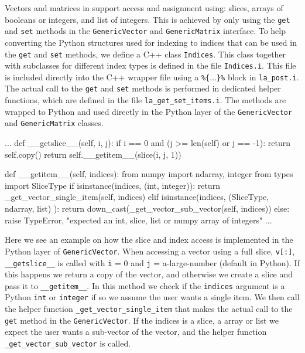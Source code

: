 Vectors and matrices in \pydolfin support access and assignment using: slices, \numpy arrays of booleans or integers, and list of integers. This is achieved by only using the \texttt{get} and \texttt{set} methods in the \texttt{GenericVector} and \texttt{GenericMatrix} interface. To help converting the Python structures used for indexing to indices that can be used in the \texttt{get} and \texttt{set} methods, we define a C++ class \texttt{Indices}. This class together with subclasses for different index types is defined in the file \texttt{Indices.i}. This file is included directly into the C++ wrapper file using a \texttt{\%\{$\ldots$\}\%} block in \texttt{la\_post.i}. The actual call to the \texttt{get} and \texttt{set} methods is performed in dedicated helper functions, which are defined in the file \texttt{la\_get}\texttt{\_set\_items.i}. The methods are wrapped to Python and used directly in the Python layer of the \texttt{GenericVector} and \texttt{GenericMatrix} classes.
\begin{c++}
   ...
    def __getslice__(self, i, j):
        if i == 0 and (j >= len(self) or j == -1):
            return self.copy()
        return self.__getitem__(slice(i, j, 1))

    def __getitem__(self, indices):
        from numpy import ndarray, integer
        from types import SliceType
        if isinstance(indices, (int, integer)):
            return _get_vector_single_item(self, indices)
        elif isinstance(indices, (SliceType, ndarray, list) ):
            return down_cast(_get_vector_sub_vector(self, indices))
        else:
            raise TypeError, "expected an int, slice, list or numpy array of integers"
  ...
\end{c++}
Here we see an example on how the slice and index access is implemented in the Python layer of \texttt{GenericVector}. When accessing a vector using a full slice, \texttt{v[:]}, \texttt{\_\_getslice\_\_} is called with \texttt{i} = 0 and \texttt{j} = a-large-number (default in Python).  If this happens we return a copy of the vector, and otherwise we create a slice and pass it to \texttt{\_\_getitem\_\_}. In this method we check if the \texttt{indices} argument is a Python \texttt{int} or \numpy \texttt{integer} if so we assume the user wants a single item. We then call the helper function \texttt{\_get\_vector}\texttt{\_single\_item} that makes the actual call to the \texttt{get} method in the \texttt{GenericVector}. If the indices is a slice, a \numpy array or list we expect the user wants a sub-vector of the vector, and the helper function \texttt{\_get\_vector}\texttt{\_sub\_vector} is called.\par

